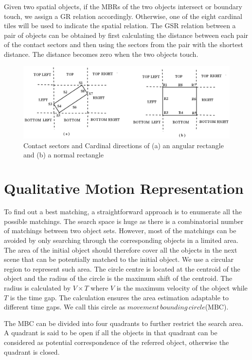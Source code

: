 \documentclass[letterpaper]{article}
\begin{document}
Given two spatial objects, if the MBRs of the two objects intersect or boundary touch, we assign a GR relation accordingly. Otherwise, one of the eight cardinal tiles will be used to indicate the spatial relation. The GSR relation between a pair of objects can be obtained by first calculating the distance between each pair of the contact sectors and then using the sectors from the pair with the shortest distance. The distance becomes zero when the two objects touch. 

\begin{figure}[h!]
\centering\includegraphics[scale=0.25]{EGSR-relations.png}\caption{Contact sectors and Cardinal directions of (a) an angular rectangle and (b) a normal rectangle}
\end{figure}

\section{Qualitative Motion Representation}

 To find out a best matching, a straightforward approach is to enumerate all the possible matchings. The search space is huge as there is a combinatorial number of matchings between two object sets. However, most of the matchings can be avoided by only searching through the corresponding objects in a limited area. The area of the initial object should therefore cover all the objects in the next scene that can be potentially matched to the initial object.  We use a circular region to represent such area. The circle centre is located at the centroid of the object and the radius of the circle is the maximum shift of the centroid. The radius is calculated by $V \times T$ where $V$ is the maximum velocity of the object while $T$ is the time gap. The calculation ensures the area estimation adaptable to different time gaps. We call this circle as $movement\,bounding\,circle$(MBC). 

The MBC can be divided into four quadrants to further restrict the search area. A quadrant is said to be open if all the objects in that quadrant can be considered as potential correspondence of the referred object, otherwise the quadrant is closed.  
\end{document}
